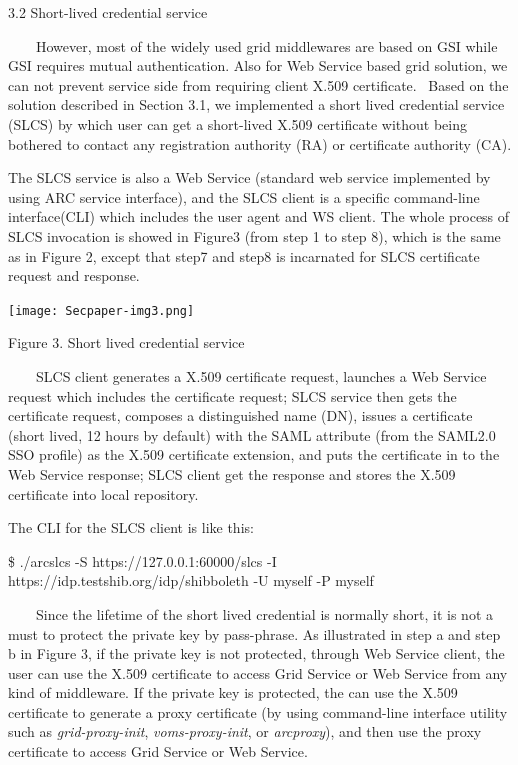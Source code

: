 \documentclass{article}
\begin{document}
\bigskip

3.2 Short-lived credential service

\ \ \ \ However, most of the widely used grid middlewares are based on
GSI while GSI requires mutual authentication. Also for Web Service
based grid solution, we can not prevent service side from requiring
client X.509 certificate. \ Based on the solution described in Section
3.1, we implemented a short lived credential service (SLCS) by which
user can get a short-lived X.509 certificate without being bothered to
contact any registration authority (RA) or certificate authority (CA).

The SLCS service is also a Web Service (standard web service implemented
by using ARC service interface), and the SLCS client is a specific
command-line interface(CLI) which includes the user agent and WS
client. The whole process of SLCS invocation is showed in Figure3 (from
step 1 to step 8), which is the same as in Figure 2, except that step7
and step8 is incarnated for SLCS certificate request and response. 


\bigskip



\begin{center}
\texttt{[image: Secpaper-img3.png]}
\end{center}
{\centering
Figure 3. Short lived credential service
\par}

\ \ \ \ SLCS client generates a X.509 certificate request, launches a
Web Service request which includes the certificate request; SLCS
service then gets the certificate request, composes a distinguished
name (DN), issues a certificate (short lived, 12 hours by default) with
the SAML attribute (from the SAML2.0 SSO profile) as the X.509
certificate extension, and puts the certificate in to the Web Service
response; SLCS client get the response and stores the X.509 certificate
into local repository.

The CLI for the SLCS client is like this:

\$ ./arcslcs -S https://127.0.0.1:60000/slcs -I
https://idp.testshib.org/idp/shibboleth -U myself -P myself

\ \ \ \ Since the lifetime of the short lived credential is normally
short, it is not a must to protect the private key by pass-phrase. As
illustrated in step a and step b in Figure 3, if the private key is not
protected, through Web Service client, the user can use the X.509
certificate to access Grid Service or Web Service from any kind of
middleware. If the private key is protected, the can use the X.509
certificate to generate a proxy certificate (by using command-line
interface utility such as \textit{grid-proxy-init},
\textit{voms-}\textit{proxy-init}, or \textit{arcproxy}), and then use
the proxy certificate to access Grid Service or Web Service. 
\end{document}
